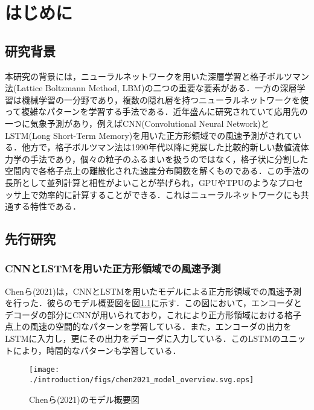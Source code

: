 \chapter{はじめに}

\section{研究背景}
本研究の背景には，ニューラルネットワークを用いた深層学習と格子ボルツマン法(Lattice Boltzmann Method, LBM)の二つの重要な要素がある．一方の深層学習は機械学習の一分野であり，複数の隠れ層を持つニューラルネットワークを使って複雑なパターンを学習する手法である\cite{doi:10.1126/science.1127647}．近年盛んに研究されていて応用先の一つに気象予測があり\cite{Schultz2021}，例えばCNN(Convolutional Neural Network)\cite{Yamashita2018}とLSTM(Long Short-Term Memory)\cite{10.1162/neco.1997.9.8.1735}を用いた正方形領域での風速予測がされている\cite{CHEN2021114451}．他方で，格子ボルツマン法は1990年代以降に発展した比較的新しい数値流体力学の手法であり，個々の粒子のふるまいを扱うのではなく，格子状に分割した空間内で各格子点上の離散化された速度分布関数を解くものである\cite{doi:10.1146/annurev.fluid.30.1.329}．この手法の長所として並列計算と相性がよいことが挙げられ，GPUやTPUのようなプロセッサ上で効率的に計算することができる\cite{Satofuka1999}．これはニューラルネットワークにも共通する特性である\cite{OH20041311}．

\section{先行研究}
\subsection{CNNとLSTMを用いた正方形領域での風速予測 \label{subsec:chen2021}}
Chenら(2021)は，CNNとLSTMを用いたモデルによる正方形領域での風速予測を行った\cite{CHEN2021114451}．彼らのモデル概要図を図\ref{fig:chen2021_architecture}に示す．この図において，エンコーダとデコーダの部分にCNNが用いられており，これにより正方形領域における格子点上の風速の空間的なパターンを学習している．また，エンコーダの出力をLSTMに入力し，更にその出力をデコーダに入力している．このLSTMのユニットにより，時間的なパターンも学習している．
\begin{figure}[bp]
    \centering
    \texttt{[image: ./introduction/figs/chen2021\_model\_overview.svg.eps]}
    \caption{Chenら(2021)のモデル概要図\cite{CHEN2021114451}}
    \label{fig:chen2021_architecture}
\end{figure}

